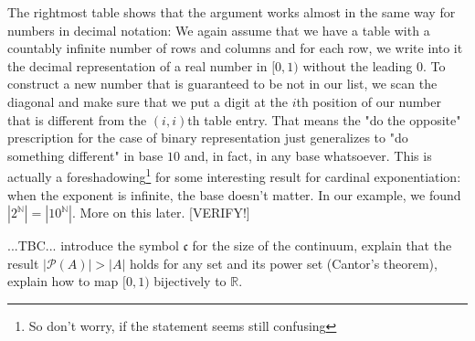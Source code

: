 \medskip
The rightmost table shows that the argument works almost in the same way for numbers in decimal notation: We again assume that we have a table with a countably infinite number of rows and columns and for each row, we write into it the decimal representation of a real number in $[0,1)$ without the leading $0$. To construct a new number that is guaranteed to be not in our list, we scan the diagonal and make sure that we put a digit at the $i$th position of our number that is different from the $(i,i)$th table entry. That means the "do the opposite" prescription for the case of binary representation just generalizes to "do something different" in base $10$ and, in fact, in any base whatsoever. This is actually a foreshadowing\footnote{So don't worry, if the statement seems still confusing} for some interesting result for cardinal exponentiation: when the exponent is infinite, the base doesn't matter. In our example, we found $|2^{\mathbb{N}}| = |10^{\mathbb{N}}|$. More on this later. [VERIFY!]

\medskip
...TBC... introduce the symbol $\mathfrak{c}$ for the size of the continuum, explain that the result $|\mathcal{P}(A)| > |A|$ holds for any set and its power set (Cantor's theorem), explain how to map $[0,1)$ bijectively to $\mathbb{R}$.



